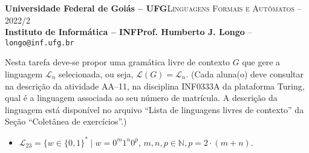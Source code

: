 \documentclass[12pt]{article}
\def\discente{Iury Alexandre Alves Bo}
\def\matricula{202103735}
\def\ua{11}
\def\myling{{23}} %
\begin{document}
 \begin{tcolorbox}[rounded corners, colback=blue!3, colframe=blue!40!black]
  \footnotesize\textbf{Universidade Federal de Goiás -- UFG}\hfill \textsc{Linguagens Formais e Autômatos -- 2022/2}\\
  \footnotesize\textbf{Instituto de Informática -- INF\hfill Prof. Humberto J. Longo} -- \scriptsize\texttt{longo@inf.ufg.br}
 \end{tcolorbox}\bigskip
%
\begin{tcolorbox}[rounded corners, colback=blue!2, colframe=blue!40!black, title=\textbf{Atividade AA-\ua}]
  Nesta tarefa deve-se propor uma gramática livre de contexto $G$ que gere a linguagem $\mathcal{L}_n$ selecionada, ou seja, $\mathcal{L}(G)=\mathcal{L}_n$. (Cada aluna(o) deve consultar na descrição da atividade AA--\ua, na disciplina INF0333A da plataforma Turing, qual é a linguagem associada ao seu número de matrícula. A descrição da linguagem está disponível no arquivo ``Lista de linguagens livres de contexto'' da Seção ``Coletânea de exercícios''.)
\end{tcolorbox}\bigskip

%
\begin{tcolorbox}[rounded corners, colback=yellow!5, colframe=red!40!black, title={\discente\ (\matricula)}]
 \begin{itemize}[leftmargin=*]
  \item $\mathcal{L}_{\myling} = \{w\in\{0,1\}^*\mid w = 0^m1^n0^p$, $ m,n,p\in\mathbb{N}, p = 2\cdot(m+n)$.
 \end{itemize}
\end{tcolorbox}\bigskip
\end{document}
